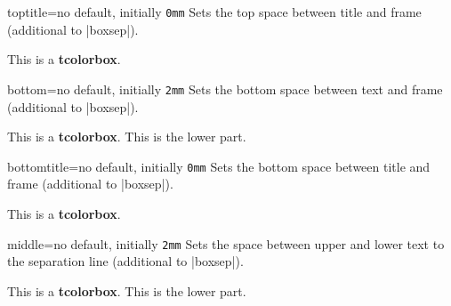 \begin{docTcbKey}{toptitle}{=}{no default, initially \texttt{0mm}}
  Sets the top space between title and frame (additional to |boxsep|).
\begin{dispExample}

\begin{tcolorbox}[toptitle=3mm,title=My title]
This is a \textbf{tcolorbox}.
\end{tcolorbox}
\end{dispExample}
\end{docTcbKey}

\clearpage
\begin{docTcbKey}{bottom}{=}{no default, initially \texttt{2mm}}
  Sets the bottom space between text and frame (additional to |boxsep|).
\begin{dispExample}

\begin{tcolorbox}[bottom=0mm]
This is a \textbf{tcolorbox}.
\tcblower
This is the lower part.
\end{tcolorbox}
\end{dispExample}
\end{docTcbKey}

\begin{docTcbKey}{bottomtitle}{=}{no default, initially \texttt{0mm}}
  Sets the bottom space between title and frame (additional to |boxsep|).
\begin{dispExample}

\begin{tcolorbox}[bottomtitle=3mm,title=My title]
This is a \textbf{tcolorbox}.
\end{tcolorbox}
\end{dispExample}
\end{docTcbKey}


\begin{docTcbKey}{middle}{=}{no default, initially \texttt{2mm}}
  Sets the space between upper and lower text to the separation line
  (additional to |boxsep|).
\begin{dispExample}

\begin{tcolorbox}[middle=0mm,boxsep=0mm]
This is a \textbf{tcolorbox}.
\tcblower
This is the lower part.
\end{tcolorbox}
\end{dispExample}
\end{docTcbKey}

